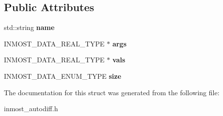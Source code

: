 \subsection*{Public Attributes}
\begin{DoxyCompactItemize}
\item 
\hypertarget{structINMOST_1_1Automatizator_1_1table_a203af5d89805c5657d7cbf4737b4636d}{std\-::string {\bfseries name}}\label{structINMOST_1_1Automatizator_1_1table_a203af5d89805c5657d7cbf4737b4636d}

\item 
\hypertarget{structINMOST_1_1Automatizator_1_1table_affb50f813846d78f671041406eea0d10}{I\-N\-M\-O\-S\-T\-\_\-\-D\-A\-T\-A\-\_\-\-R\-E\-A\-L\-\_\-\-T\-Y\-P\-E $\ast$ {\bfseries args}}\label{structINMOST_1_1Automatizator_1_1table_affb50f813846d78f671041406eea0d10}

\item 
\hypertarget{structINMOST_1_1Automatizator_1_1table_a85c68ce74998d98e405df153bd526730}{I\-N\-M\-O\-S\-T\-\_\-\-D\-A\-T\-A\-\_\-\-R\-E\-A\-L\-\_\-\-T\-Y\-P\-E $\ast$ {\bfseries vals}}\label{structINMOST_1_1Automatizator_1_1table_a85c68ce74998d98e405df153bd526730}

\item 
\hypertarget{structINMOST_1_1Automatizator_1_1table_a9c205c5870a155a245c42199fff8974a}{I\-N\-M\-O\-S\-T\-\_\-\-D\-A\-T\-A\-\_\-\-E\-N\-U\-M\-\_\-\-T\-Y\-P\-E {\bfseries size}}\label{structINMOST_1_1Automatizator_1_1table_a9c205c5870a155a245c42199fff8974a}

\end{DoxyCompactItemize}


The documentation for this struct was generated from the following file\-:\begin{DoxyCompactItemize}
\item 
inmost\-\_\-autodiff.\-h\end{DoxyCompactItemize}
